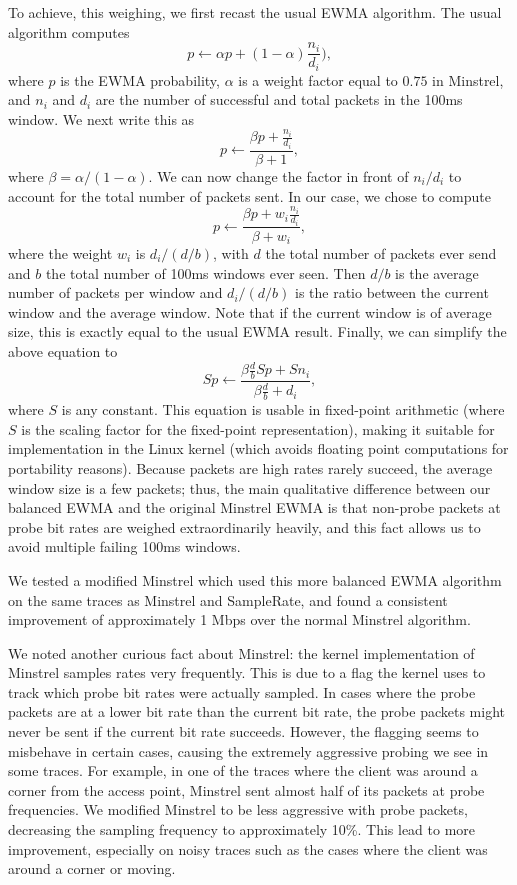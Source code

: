 \documentclass[twocolumn,10pt]{article}
\begin{document}
To achieve, this weighing, we first recast the usual EWMA algorithm.
The usual algorithm computes $$p \gets \alpha p + (1 - \alpha)
\frac{n_i}{d_i}),$$ where $p$ is the EWMA probability, $\alpha$ is a
weight factor equal to $0.75$ in Minstrel, and $n_i$ and $d_i$ are the
number of successful and total packets in the 100ms window.  We next
write this as $$p \gets \frac{\beta p + \frac{n_i}{d_i}}{\beta + 1},$$
where $\beta = \alpha / (1 - \alpha)$.  We can now change the factor
in front of $n_i / d_i$ to account for the total number of packets
sent.  In our case, we chose to compute $$p \gets \frac{\beta p + w_i
  \frac{n_i}{d_i}}{\beta + w_i},$$ where the weight $w_i$ is $d_i / (d
/ b)$, with $d$ the total number of packets ever send and $b$ the
total number of 100ms windows ever seen.  Then $d / b$ is the average
number of packets per window and $d_i / (d / b)$ is the ratio between
the current window and the average window.  Note that if the current
window is of average size, this is exactly equal to the usual EWMA
result.  Finally, we can simplify the above equation to $$S p \gets
\frac{\beta \frac{d}{b} S p + S n_i}{\beta \frac{d}{b} + d_i},$$ where
$S$ is any constant.  This equation is usable in fixed-point
arithmetic (where $S$ is the scaling factor for the fixed-point
representation), making it suitable for implementation in the Linux
kernel (which avoids floating point computations for
portability reasons).  Because packets are high rates rarely succeed,
the average window size is a few packets; thus, the main qualitative
difference between our balanced EWMA and the original Minstrel EWMA is
that non-probe packets at probe bit rates are weighed extraordinarily
heavily, and this fact allows us to avoid multiple failing 100ms
windows.

We tested a modified Minstrel which used this more balanced EWMA
algorithm on the same traces as Minstrel and SampleRate, and found a
consistent improvement of approximately 1 Mbps over the normal
Minstrel algorithm.

We noted another curious fact about Minstrel: the kernel
implementation of Minstrel samples rates very frequently.  This is due
to a flag the kernel uses to track which probe bit rates were actually
sampled.  In cases where the probe packets are at a lower bit rate
than the current bit rate, the probe packets might never be sent if
the current bit rate succeeds.  However, the flagging seems to
misbehave in certain cases, causing the extremely aggressive probing
we see in some traces.  For example, in one of the traces where the
client was around a corner from the access point, Minstrel sent almost
half of its packets at probe frequencies.  We modified Minstrel to be
less aggressive with probe packets, decreasing the sampling frequency
to approximately 10\%.  This lead to more improvement, especially on
noisy traces such as the cases where the client was around a corner or
moving.
\end{document}

